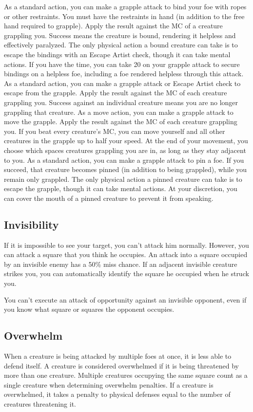  As a standard action, you can make a grapple attack to bind your foe with ropes or other restraints. You must have the restraints in hand (in addition to the free hand required to grapple). Apply the result against the MC of a creature grappling you. Success means the creature is bound, rendering it helpless and effectively paralyzed. The only physical action a bound creature can take is to escape the bindings with an Escape Artist check, though it can take mental actions. If you have the time, you can take 20 on your grapple attack to secure bindings on a helpless foe, including a foe rendered helpless through this attack.
 As a standard action, you can make a grapple attack or Escape Artist check to escape from the grapple. Apply the result against the MC of each creature grappling you. Success against an individual creature means you are no longer grappling that creature.
 As a move action, you can make a grapple attack to move the grapple. Apply the result against the MC of each creature grappling you. If you beat every creature's MC, you can move yourself and all other creatures in the grapple up to half your speed. At the end of your movement, you choose which spaces creatures grappling you are in, as long as they stay adjacent to you.
 As a standard action, you can make a grapple attack to pin a foe. If you succeed, that creature becomes pinned (in addition to being grappled), while you remain only grappled. The only physical action a pinned creature can take is to escape the grapple, though it can take mental actions. At your discretion, you can cover the mouth of a pinned creature to prevent it from speaking. 

\subsection{Invisibility}
If it is impossible to see your target, you can't attack him normally. However, you can attack a square that you think he occupies. An attack into a square occupied by an invisible enemy has a 50\% miss chance. If an adjacent invisible creature strikes you, you can automatically identify the square he occupied when he struck you.

You can't execute an attack of opportunity against an invisible opponent, even if you know what square or squares the opponent occupies.

\subsection{Overwhelm}\label{Overwhelm}
When a creature is being attacked by multiple foes at once, it is less able to defend itself. A creature is considered overwhelmed if it is being threatened by more than one creature. Multiple creatures occupying the same square count as a single creature when determining overwhelm penalties. If a creature is overwhelmed, it takes a penalty to physical defenses equal to the number of creatures threatening it.

